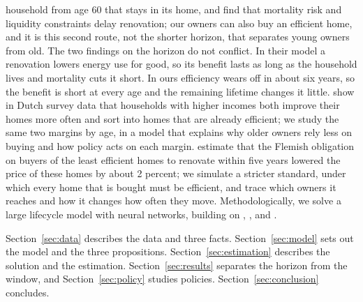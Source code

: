 household from age 60 that stays in its home, and find that mortality risk
and liquidity constraints delay renovation; our owners can also buy an
efficient home, and it is this second route, not the shorter horizon, that
separates young owners from old. The two findings on the horizon do not
conflict. In their model a renovation lowers energy use for good, so its
benefit lasts as long as the household lives and mortality cuts it short. In
ours efficiency wears off in about six years, so the benefit is short at
every age and the remaining lifetime changes it little.
\citet{droes2024home} show in Dutch survey
data that households with higher incomes both improve their homes more often
and sort into homes that are already efficient; we study the same two
margins by age, in a model that explains why older owners rely less on
buying and how policy acts on each margin. \citet{reusens2026renovation}
estimate that the Flemish obligation on buyers of the least efficient homes
to renovate within five years lowered the price of these homes by about 2
percent; we simulate a stricter standard, under which every home that is
bought must be efficient, and trace which owners it reaches and how it
changes how often they move. Methodologically, we solve a large
lifecycle model with neural networks, building on \citet{maliar2021deep},
\citet{azinovic2022deep}, and
\citet{druedahl2026deep,druedahl2026nonconvex}.



Section~\ref{sec:data} describes the data and three facts.
Section~\ref{sec:model} sets out the model and the three propositions.
Section~\ref{sec:estimation} describes the solution and the estimation.
Section~\ref{sec:results} separates the horizon from the window, and
Section~\ref{sec:policy} studies policies. Section~\ref{sec:conclusion}
concludes.
